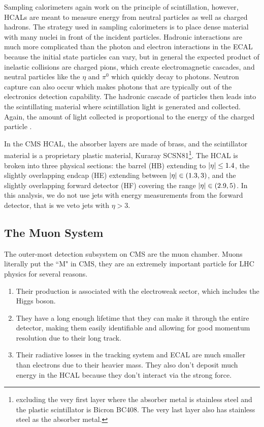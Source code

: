     Sampling calorimeters again work on the principle of scintillation, however, HCALs are meant to measure energy from neutral particles as well as charged hadrons. The strategy used in sampling calorimeters is to place dense material with many nuclei in front of the incident particles. Hadronic interactions are much more complicated than the photon and electron interactions in the ECAL because the initial state particles can vary, but in general the expected product of inelastic collisions are charged pions, which create electromagnetic cascades, and neutral particles like the $\eta$ and $\pi^0$ which quickly decay to photons. \cite[sec 35.9.2]{PDG} \cite{green_detectors} Neutron capture can also occur which makes photons that are typically out of the electronics detection capability. The hadronic cascade of particles then leads into the scintillating material where scintillation light is generated and collected. Again, the amount of light collected is proportional to the energy of the charged particle .

    In the CMS HCAL, the absorber layers are made of brass, and the scintillator material is a proprietary plastic material, Kuraray SCSN81\footnote{excluding the very first layer where the absorber metal is stainless steel and the plastic scintillator is Bicron BC408. The very last layer also has stainless steel as the absorber metal.}. The HCAL is broken into three physical sections: the barrel (HB) extending to $\lvert \eta \rvert \le 1.4$, the slightly overlapping endcap (HE) extending between $\lvert \eta \rvert \in (1.3,3)$, and the slightly overlapping forward detector (HF) covering the range $\lvert \eta \rvert \in (2.9,5)$. In this analysis, we do not use jets with energy measurements from the forward detector, that is we veto jets with $\eta > 3$.


  \subsection{The Muon System}
    The outer-most detection subsystem on CMS are the muon chamber. Muons literally put the ``M" in CMS, they are an extremely important particle for LHC physics for several reasons. \cite[sec 1.2]{muon_tdr}

    \begin{enumerate}
     \item Their production is associated with the electroweak sector, which includes the Higgs boson.
     \item They have a long enough lifetime that they can make it through the entire detector, making them easily identifiable and allowing for good momentum resolution due to their long track.
     \item Their radiative losses in the tracking system and ECAL are much smaller than electrons due to their heavier mass. They also don't deposit much energy in the HCAL because they don't interact via the strong force.
    \end{enumerate}

